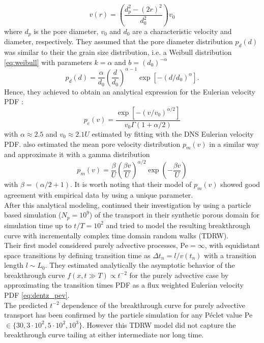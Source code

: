 \begin{equation}\label{eq:dentz_poiseuille}
v(r)=\left(\frac{d_p^2-(2r)^2}{d_0^2}\right)v_0
\end{equation}
where $d_p$ is the pore diameter, $v_0$ and $d_0$ are a characteristic velocity and diameter, respectively.
They assumed that the pore diameter distribution $p_d(d)$ was similar to their the grain size distribution, i.e. a Weibull distribution \eqref{eq:weibull} with parameters $k=\alpha$ and $b=(d_0)^{-\alpha}$
\[
p_d(d)=\frac{\alpha}{d_0}\left(\frac{d}{d_0}\right)^{\alpha-1}\exp[-(d/d_0)^\alpha].
\]
Hence, they achieved to obtain an analytical expression for the Eulerian velocity PDF :
\begin{equation}\label{eq:dentz_pev}
p_e(v)=\frac{\exp[-(v/v_0)^{\alpha/2}]}{v_0\Gamma(1+\alpha/2)}
\end{equation}
with $\alpha\approx2.5$ and $v_0\approx2.1U$ estimated by fitting with the DNS Eulerian velocity PDF.
\citeauthor{Dentz2017} also estimated the mean pore velocity distribution $p_m(v)$ in a similar way and approximate it with a gamma distribution
\begin{equation}\label{eq:dentz_pmv}
p_m(v)=\frac{\beta}{U}\left(\frac{\beta v}{U}\right)^{\alpha/2}\exp\left(-\frac{\beta v}{U}\right) 
\end{equation}
with $\beta=(\alpha/2+1)$. 
It is worth noting that their model of $p_m(v)$ showed good agreement with empirical data by using a unique parameter.\\
After this analytical modeling, \citeauthor{Dentz2017} continued their investigation by using a particle based simulation ($N_p=10^9$) of the transport in their synthetic porous domain for simulation time up to $t/T=10^2$ and tried to model the resulting breakthrough curve with incrementally complex time domain random walks (TDRW).\\
Their first model considered purely advective processes, $\mathrm{Pe}=\infty$, with equidistant space transitions by defining transition time as $\Delta t_n=l/v(t_n)$ with a transition length  $l\sim L_0$. 
They estimated analytically the asymptotic behavior of the breakthrough curve $f(x,t\gg T)\propto t^{-2}$ for the purely advective case by approximating the transition times PDF as a flux weighted Eulerian velocity PDF \eqref{eq:dentz_pev}.\\
The predicted $t^{-2}$ dependence of the breakthrough curve for purely advective transport has been confirmed by the particle simulation for any Péclet value Pe$\in\{30, 3\cdot10^2, 5\cdot10^2, 10^3\}$. However this TDRW model did not capture the breakthrough curve tailing at either intermediate nor long time.\\
